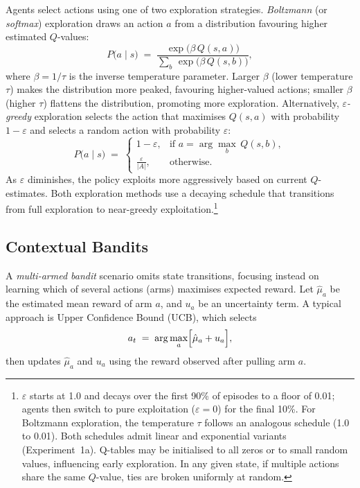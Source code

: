 Agents select actions using one of two exploration strategies. \emph{Boltzmann} (or \emph{softmax}) exploration draws an action $a$ from a distribution favouring higher estimated $Q$-values:
\begin{equation}
P\bigl(a \mid s\bigr)
\;=\;
\frac{\exp\!\bigl(\beta\,Q(s,a)\bigr)}{\sum_{b}\,\exp\!\bigl(\beta\,Q(s,b)\bigr)},
\label{eq:boltzmann}
\end{equation}
where $\beta = 1/\tau$ is the inverse temperature parameter. Larger $\beta$ (lower temperature $\tau$) makes the distribution more peaked, favouring higher-valued actions; smaller $\beta$ (higher $\tau$) flattens the distribution, promoting more exploration. Alternatively, \emph{$\varepsilon$-greedy} exploration selects the action that maximises $Q(s,a)$ with probability $1-\varepsilon$ and selects a random action with probability $\varepsilon$:
\begin{equation}
P\bigl(a \mid s\bigr)
\;=\;
\begin{cases}
1-\varepsilon, & \text{if }a = \displaystyle\arg\max_{b}\,Q(s,b),\\
\displaystyle\frac{\varepsilon}{|A|}, & \text{otherwise}.
\end{cases}
\label{eq:egreedy}
\end{equation}
As $\varepsilon$ diminishes, the policy exploits more aggressively based on current $Q$-estimates. Both exploration methods use a decaying schedule that transitions from full exploration to near-greedy exploitation.\footnote{$\varepsilon$ starts at 1.0 and decays over the first 90\% of episodes to a floor of 0.01; agents then switch to pure exploitation ($\varepsilon = 0$) for the final 10\%. For Boltzmann exploration, the temperature $\tau$ follows an analogous schedule (1.0 to 0.01). Both schedules admit linear and exponential variants (Experiment~1a). Q-tables may be initialised to all zeros or to small random values, influencing early exploration. In any given state, if multiple actions share the same $Q$-value, ties are broken uniformly at random.}

\subsection{Contextual Bandits}
\label{sec:contextual_bandits}

A \emph{multi-armed bandit} scenario omits state transitions, focusing instead on learning which of several actions (arms) maximises expected reward. Let $\hat{\mu}_a$ be the estimated mean reward of arm $a$, and $u_a$ be an uncertainty term. A typical approach is Upper Confidence Bound (UCB), which selects
\begin{equation}
a_t
\;=\;
\arg\max_{a}\Bigl[\hat{\mu}_a + u_a\Bigr],
\end{equation}
then updates $\hat{\mu}_a$ and $u_a$ using the reward observed after pulling arm $a$.

